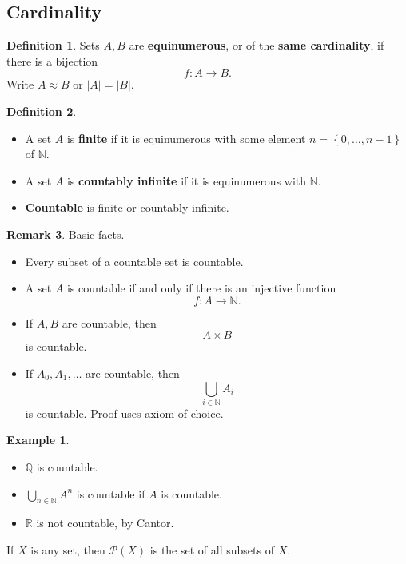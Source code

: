 \documentclass{article}
\newcommand{\N}{\mathbb{N}}
\newcommand{\Q}{\mathbb{Q}}
\newcommand{\R}{\mathbb{R}}
\newcommand{\rb}[1]{\left( #1 \right)}
\newcommand{\cb}[1]{\left\{ #1 \right\}}
\newcommand{\abs}[1]{\left\lvert #1 \right\rvert}
\theoremstyle{definition}\newtheorem{definition}{Definition}[subsection]
\theoremstyle{definition}\newtheorem{remark1}[definition]{Remark}
\theoremstyle{definition}\newtheorem{example1}[definition]{Example}
\theoremstyle{definition}\newtheorem*{remark2}{Remark}
\theoremstyle{definition}\newtheorem*{example2}{Example}
\theoremstyle{definition}\newtheorem*{note}{Note}
\theoremstyle{definition}\newtheorem*{notation}{Notation}
\begin{document}
\subsection{Cardinality}

\begin{definition}
Sets $ A, B $ are \textbf{equinumerous}, or of the \textbf{same cardinality}, if there is a bijection
$$ f : A \to B. $$
Write $ A \approx B $ or $ \abs{A} = \abs{B} $.
\end{definition}

\begin{definition}
\hfill
\begin{itemize}
\item A set $ A $ is \textbf{finite} if it is equinumerous with some element $ n = \cb{0, \dots, n - 1} $ of $ \N $.
\item A set $ A $ is \textbf{countably infinite} if it is equinumerous with $ \N $.
\item \textbf{Countable} is finite or countably infinite.
\end{itemize}
\end{definition}

\pagebreak

\begin{remark1}
Basic facts.
\begin{itemize}
\item Every subset of a countable set is countable.
\item A set $ A $ is countable if and only if there is an injective function
$$ f : A \to \N. $$
\item If $ A, B $ are countable, then
$$ A \times B $$
is countable.
\item If $ A_0, A_1, \dots $ are countable, then
$$ \bigcup_{i \in \N} A_i $$
is countable. Proof uses axiom of choice.
\end{itemize}
\end{remark1}

\begin{example2}
\hfill
\begin{itemize}
\item $ \Q $ is countable.
\item $ \bigcup_{n \in \N} A^n $ is countable if $ A $ is countable.
\item $ \R $ is not countable, by Cantor.
\end{itemize}
\end{example2}

If $ X $ is any set, then $ \mathcal{P}\rb{X} $ is the set of all subsets of $ X $.
\end{document}
